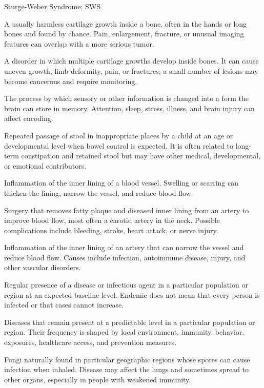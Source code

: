\synonyms
Sturge-Weber Syndrome; SWS

 A usually harmless cartilage growth inside a bone, often in the hands or long bones and found by chance. Pain, enlargement, fracture, or unusual imaging features can overlap with a more serious tumor.

 A disorder in which multiple cartilage growths develop inside bones. It can cause uneven growth, limb deformity, pain, or fractures; a small number of lesions may become cancerous and require monitoring.

 The process by which sensory or other information is changed into a form the brain can store in memory. Attention, sleep, stress, illness, and brain injury can affect encoding.

 Repeated passage of stool in inappropriate places by a child at an age or developmental level when bowel control is expected. It is often related to long-term constipation and retained stool but may have other medical, developmental, or emotional contributors.

 Inflammation of the inner lining of a blood vessel. Swelling or scarring can thicken the lining, narrow the vessel, and reduce blood flow.

 Surgery that removes fatty plaque and diseased inner lining from an artery to improve blood flow, most often a carotid artery in the neck. Possible complications include bleeding, stroke, heart attack, or nerve injury.

 Inflammation of the inner lining of an artery that can narrow the vessel and reduce blood flow. Causes include infection, autoimmune disease, injury, and other vascular disorders.

 Regular presence of a disease or infectious agent in a particular population or region at an expected baseline level. Endemic does not mean that every person is infected or that cases cannot increase.

 Diseases that remain present at a predictable level in a particular population or region. Their frequency is shaped by local environment, immunity, behavior, exposures, healthcare access, and prevention measures.

 Fungi naturally found in particular geographic regions whose spores can cause infection when inhaled. Disease may affect the lungs and sometimes spread to other organs, especially in people with weakened immunity.

